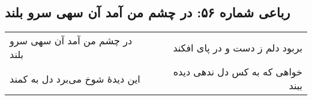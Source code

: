 \begin{center}
\section*{رباعی شماره ۵۶: در چشم من آمد آن سهی سرو بلند}
\label{sec:056}
\begin{longtable}{l p{0.5cm} r}
در چشم من آمد آن سهی سرو بلند
&&
بربود دلم ز دست و در پای افکند
\\
این دیدهٔ شوخ می‌برد دل به کمند
&&
خواهی که به کس دل ندهی دیده ببند
\\
\end{longtable}
\end{center}
